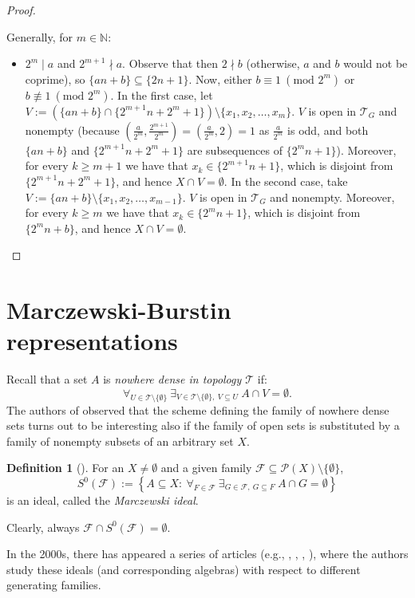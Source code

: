 \documentclass{amsart}
\theoremstyle{definition}
\newtheorem{df}[thm]{Definition}
\newcommand{\N}{{\mathbb N}}
\newcommand{\T}{\mathcal{T}}
\newcommand{\modulo}{\textrm{mod }}
\newcommand{\MB}{S^0}
\begin{document}
\begin{proof}
\begin{itemize}
\end{itemize}
Generally, for $m\in\N$:
\begin{itemize}
 \item $2^m\mid a$ and $2^{m+1}\nmid a$. Observe that then $2 \nmid b$ (otherwise, $a$ and $b$ would not be coprime), so $\{an+b\}\subseteq \{2n+1\}$. Now, either $b\equiv 1\ (\modulo 2^m)$ or $b \not\equiv 1\ (\modulo 2^m)$. In the first case, let $V := (\{an+b\} \cap \{2^{m+1}n+2^m+1\})\setminus\{x_1, x_2,\ldots, x_m\}$. $V$ is open in $\T_G$ and nonempty (because $\left(\frac{a}{2^m},\frac{2^{m+1}}{2^m}\right)=\left(\frac{a}{2^m},2\right)=1$ as $\frac{a}{2^m}$ is odd, and both $\{an+b\}$ and $\{2^{m+1}n+2^m+1\}$ are subsequences of $\{2^m n+1\}$). Moreover, for every $k\geq m+1$ we have that $x_k\in \{2^{m+1}n+1\}$, which is disjoint from $\{2^{m+1}n+2^m+1\}$, and hence $X\cap V = \emptyset$. In the second case, take $V := \{an+b\} \setminus\{x_1, x_2,\ldots, x_{m-1}\}$. $V$ is open in $\T_G$ and nonempty. Moreover, for every $k\geq m$ we have that $x_k\in \{2^m n+1\}$, which is disjoint from $\{2^m n+b\}$, and hence $X\cap V = \emptyset$.
\end{itemize}
\end{proof}


\section{Marczewski-Burstin representations}

Recall that a set $A$ is \emph{nowhere dense in topology $\T$} if:
$$\forall_{U\in\T\setminus\{\emptyset\}}\ \exists_{V\in\T\setminus\{\emptyset\},\ V\subseteq U}\ A\cap V = \emptyset.$$
The authors of \cite{MB} observed that the scheme defining the family of nowhere dense sets turns out to be interesting also if the family of open sets is substituted by a family of nonempty subsets of an arbitrary set $X$.

\begin{df}[\cite{MB}] 
For an $X\neq\emptyset$ and a given family $\mathcal{F}\subseteq \mathcal{P}(X)\setminus\{\emptyset\}$,
$$\MB(\mathcal{F}) := \left\{A\subseteq X :\ \forall_{F\in\mathcal{F}}\ \exists_{G\in\mathcal{F},\ G\subseteq F}\ A\cap G=\emptyset\right\}$$
is an ideal, called the \emph{Marczewski ideal}.
\end{df}

Clearly, always $\mathcal{F}\cap \MB(\mathcal{F})=\emptyset$.

In the 2000s, there has appeared a series of articles (e.g., \cite{MB}, \cite{MB2}, \cite{MB3}, \cite{MB4}), where the authors study these ideals (and corresponding algebras) with respect to different generating families.
\end{document}
